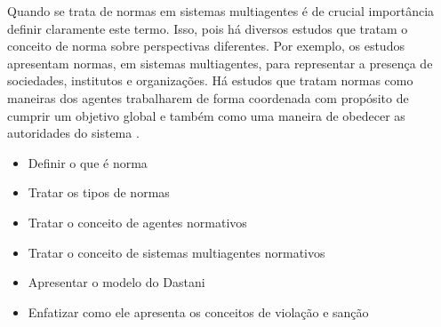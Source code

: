 Quando se trata de normas em sistemas multiagentes é de crucial importância definir claramente este termo. Isso, pois há diversos estudos que tratam o conceito de norma sobre perspectivas
diferentes. Por exemplo, os estudos \cite{formalizeagent} \cite{formalizeagent2} apresentam normas, em sistemas multiagentes, para representar a presença de sociedades, institutos e organizações.
Há estudos que tratam normas como maneiras dos agentes trabalharem de forma coordenada com propósito de cumprir um objetivo global e também como uma maneira de obedecer as autoridades do 
sistema \cite{modelingnormsforautnomousagent} \cite{amodelmultiagentsystemdynamicrelationship}.

\cite{amodelmultiagentsystemdynamicrelationship}
\cite{modelingnormsforautnomousagent}
\cite{dastaniframework}
\begin{itemize}
    \item Definir o que é norma
    \item Tratar os tipos de normas
    \item Tratar o conceito de agentes normativos
    \item Tratar o conceito de sistemas multiagentes normativos 
    \item Apresentar o modelo do Dastani
    \item Enfatizar como ele apresenta os conceitos de violação e sanção
\end{itemize}